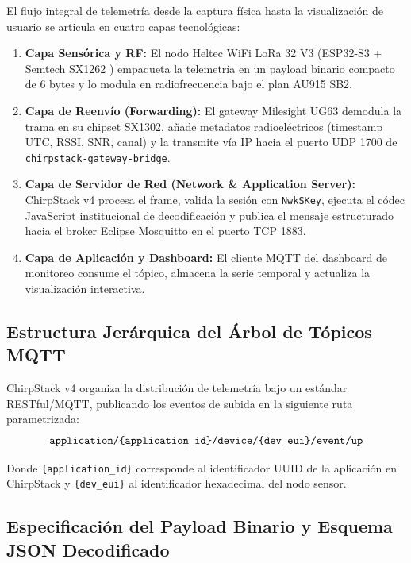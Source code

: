 \documentclass[12pt,oneside,openany,spanish,oldfontcommands]{memoir}
\begin{document}
El flujo integral de telemetría desde la captura física hasta la visualización de usuario se
articula en cuatro capas tecnológicas:
\begin{enumerate}
    \item \textbf{Capa Sensórica y RF:} El nodo Heltec WiFi LoRa 32 V3 (ESP32-S3 + Semtech SX1262
    \parencite{semtech_sx1262}) empaqueta la telemetría en un payload binario compacto de 6 bytes y
    lo modula en radiofrecuencia bajo el plan AU915 SB2.
    \item \textbf{Capa de Reenvío (Forwarding):} El gateway Milesight UG63 demodula la trama en su
    chipset SX1302, añade metadatos radioeléctricos (timestamp UTC, RSSI, SNR, canal) y la transmite
    vía IP hacia el puerto UDP 1700 de \texttt{chirpstack-gateway-bridge}.
    \item \textbf{Capa de Servidor de Red (Network \& Application Server):} ChirpStack v4
    \parencite{chirpstack_v4} procesa el frame, valida la sesión con \texttt{NwkSKey}, ejecuta el códec
    JavaScript institucional de decodificación y publica el mensaje estructurado hacia el broker
    Eclipse Mosquitto \parencite{oasis_mqtt} en el puerto TCP 1883.
    \item \textbf{Capa de Aplicación y Dashboard:} El cliente MQTT del dashboard de monitoreo consume
    el tópico, almacena la serie temporal y actualiza la visualización interactiva.
\end{enumerate}

\subsection{Estructura Jerárquica del Árbol de Tópicos MQTT}

ChirpStack v4 organiza la distribución de telemetría bajo un estándar RESTful/MQTT, publicando
los eventos de subida en la siguiente ruta parametrizada:
\begin{equation}
    \text{\ttfamily application/\{application\_id\}/device/\{dev\_eui\}/event/up}
\end{equation}

Donde \texttt{\{application\_id\}} corresponde al identificador UUID de la aplicación en
ChirpStack y \texttt{\{dev\_eui\}} al identificador hexadecimal del nodo sensor.

\subsection{Especificación del Payload Binario y Esquema JSON Decodificado}
\end{document}
